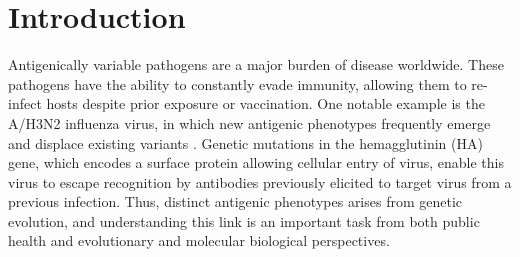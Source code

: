 \documentclass[11pt,oneside,letterpaper]{article}
\begin{document}
\begin{abstract}



\end{abstract}


\pagebreak




\section*{Introduction}


Antigenically variable pathogens are a major burden of disease worldwide. 
These pathogens have the ability to constantly evade immunity, allowing them to re-infect hosts despite prior exposure or vaccination. 
One notable example is the A/H3N2 influenza virus, in which new antigenic phenotypes frequently emerge and displace existing variants \cite{smith_mapping_2004, bedford_integrating_2014}.
Genetic mutations in the hemagglutinin (HA) gene, which encodes a surface protein allowing cellular entry of virus, enable this virus to escape recognition by antibodies previously elicited to target virus from a previous infection. 
Thus, distinct antigenic phenotypes arises from genetic evolution, and understanding this link is an important task from both public health and evolutionary and molecular biological perspectives.
\end{document}
